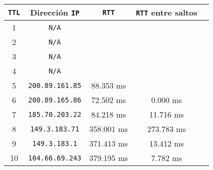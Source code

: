 \renewcommand{\arraystretch}{1.5}
\begin{tabular}{|c|c|c|c|c|} \hline
\texttt{TTL} & Dirección \texttt{IP} & \texttt{RTT} & \texttt{RTT} entre saltos \\ \hline
 1 & \texttt{N/A}           &            &            \\
 2 & \texttt{N/A}           &            &            \\
 3 & \texttt{N/A}           &            &            \\
 4 & \texttt{N/A}           &            &            \\
 5 & \texttt{200.89.161.85} & 88.353 ms  &            \\
 6 & \texttt{200.89.165.86} & 72.502 ms  & 0.000 ms   \\
 7 & \texttt{185.70.203.22} & 84.218 ms  & 11.716 ms  \\
 8 & \texttt{149.3.183.71}  & 358.001 ms & 273.783 ms \\
 9 & \texttt{149.3.183.1}   & 371.413 ms & 13.412 ms  \\
10 & \texttt{104.66.69.243} & 379.195 ms & 7.782 ms   \\ \hline
\end{tabular}
